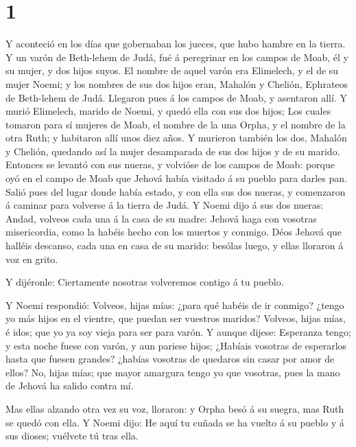 \hypertarget{section}{%
\section{1}\label{section}}

 Y aconteció en los días que gobernaban los jueces, que hubo
hambre en la tierra. Y un varón de Beth-lehem de Judá, fué á peregrinar
en los campos de Moab, él y su mujer, y dos hijos suyos.  El
nombre de aquel varón era Elimelech, y el de su mujer Noemi; y los
nombres de sus dos hijos eran, Mahalón y Chelión, Ephrateos de
Beth-lehem de Judá. Llegaron pues á los campos de Moab, y asentaron
allí.  Y murió Elimelech, marido de Noemi, y quedó ella con
sus dos hijos;  Los cuales tomaron para sí mujeres de Moab,
el nombre de la una Orpha, y el nombre de la otra Ruth; y habitaron allí
unos diez años.  Y murieron también los dos, Mahalón y
Chelión, quedando así la mujer desamparada de sus dos hijos y de su
marido.  Entonces se levantó con sus nueras, y volvióse de
los campos de Moab: porque oyó en el campo de Moab que Jehová había
visitado á su pueblo para darles pan.  Salió pues del lugar
donde había estado, y con ella sus dos nueras, y comenzaron á caminar
para volverse á la tierra de Judá.  Y Noemi dijo á sus dos
nueras: Andad, volveos cada una á la casa de su madre: Jehová haga con
vosotras misericordia, como la habéis hecho con los muertos y conmigo.
 Déos Jehová que halléis descanso, cada una en casa de su
marido: besólas luego, y ellas lloraron á voz en grito.

 Y dijéronle: Ciertamente nosotras volveremos contigo á tu
pueblo.

 Y Noemi respondió: Volveos, hijas mías: ¿para qué habéis
de ir conmigo? ¿tengo yo más hijos en el vientre, que puedan ser
vuestros maridos?  Volveos, hijas mías, é idos; que yo ya
soy vieja para ser para varón. Y aunque dijese: Esperanza tengo; y esta
noche fuese con varón, y aun pariese hijos;  ¿Habíais
vosotras de esperarlos hasta que fuesen grandes? ¿habías vosotras de
quedaros sin casar por amor de ellos? No, hijas mías; que mayor amargura
tengo yo que vosotras, pues la mano de Jehová ha salido contra mí.

 Mas ellas alzando otra vez su voz, lloraron: y Orpha besó
á su suegra, mas Ruth se quedó con ella.  Y Noemi dijo: He
aquí tu cuñada se ha vuelto á su pueblo y á sus dioses; vuélvete tú tras
ella.

